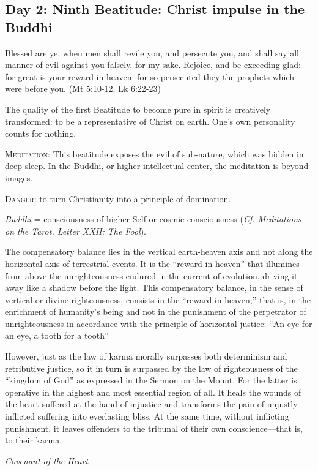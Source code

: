 \subsection*{Day 2: Ninth Beatitude: Christ impulse in the Buddhi}
Blessed are ye, when men shall revile you, and persecute you, and shall say all manner of evil against you falsely, for
my sake. Rejoice, and be exceeding glad: for great is your reward in heaven: for so persecuted they the prophets which
were before you. (Mt 5:10-12, Lk 6:22-23)

The quality of the first Beatitude to become pure in spirit is creatively transformed: to be a representative of Christ
on earth. One's own personality counts for nothing.

\textsc{Meditation}: This beatitude exposes the evil of sub-nature, which was hidden in deep sleep. In the Buddhi, or
higher intellectual center, the meditation is beyond images.

\textsc{Danger}: to turn Christianity into a principle of domination.

\emph{Buddhi} = consciousness of higher Self or cosmic consciousness (\emph{Cf. Meditations on the Tarot. Letter XXII: The
Fool}).

The compensatory balance lies in the vertical earth-heaven axis and not along the horizontal axis of terrestrial events.
It is the “reward in heaven” that illumines from above the unrighteousness endured in the current of evolution, driving
it away like a shadow before the light. This compensatory balance, in the sense of vertical or divine righteousness,
consists in the “reward in heaven,” that is, in the enrichment of humanity's being and not in the
punishment of the perpetrator of unrighteousness in accordance with the principle of horizontal justice: “An eye for an
eye, a tooth for a tooth”

\begin{quotationx}
However, just as the law of karma morally surpasses both determinism and retributive justice, so it in turn is surpassed
by the law of righteousness of the “kingdom of God” as expressed in the Sermon on the Mount. For the latter is
operative in the highest and most essential region of all. It heals the wounds of the heart suffered at the hand of
injustice and transforms the pain of unjustly inflicted suffering into everlasting bliss. At the same time, without
inflicting punishment, it leaves offenders to the tribunal of their own conscience—that is, to
their karma. \begin{flushright}\textit{Covenant of the Heart}\end{flushright}

\end{quotationx}
